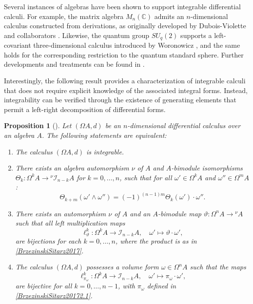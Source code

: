\documentclass{amsart}
\newtheorem{proposition}[theorem]{Proposition}
\theoremstyle{definition}
\theoremstyle{remark}
\numberwithin{equation}{section}
\begin{document}
Several instances of algebras have been shown to support integrable differential calculi. For example, the matrix algebra $M_n(\mathbb{C})$ admits an $n$-dimensional calculus constructed from derivations, as originally developed by Dubois-Violette and collaborators \cite{DuboisViolette1988, DuboisVioletteKernerMadore1990}. Likewise, the quantum group $SU_q(2)$ supports a left-covariant three-dimensional calculus introduced by Woronowicz \cite{Woronowicz1987}, and the same holds for the corresponding restriction to the quantum standard sphere. Further developments and treatments can be found in \cite{BrzezinskiElKaoutitLomp2010}.

Interestingly, the following result provides a characterization of integrable calculi that does not require explicit knowledge of the associated integral forms. Instead, integrability can be verified through the existence of generating elements that permit a left-right decomposition of differential forms.

\begin{proposition}[{\cite[Theorem 2.2]{BrzezinskiSitarz2017}}]\label{integrableequiva}
Let $(\Omega A, d)$ be an $n$-dimensional differential calculus over an algebra $A$. The following statements are equivalent:
\begin{enumerate}
    \item [\rm (1)] The calculus $(\Omega A, d)$ is integrable.

    \item [\rm (2)] There exists an algebra automorphism $\nu$ of $A$ and $A$-bimodule isomorphisms $\Theta_k: \Omega^k A \to {}^{\nu} \mathcal{I}_{n-k} A$ for $k = 0, \dotsc, n$, such that for all $\omega' \in \Omega^k A$ and $\omega'' \in \Omega^m A$:
    \[
    \Theta_{k+m}(\omega' \wedge \omega'') = (-1)^{(n-1)m} \Theta_k(\omega') \cdot \omega''.
    \]

    \item [\rm (3)] There exists an automorphism $\nu$ of $A$ and an $A$-bimodule map $\vartheta: \Omega^n A \to {}^{\nu} A$ such that all left multiplication maps
    \[
    \ell^{k}_{\vartheta}: \Omega^k A \to \mathcal{I}_{n-k} A, \quad \omega' \mapsto \vartheta \cdot \omega',
    \]
    are bijections for each $k = 0, \dotsc, n$, where the product is as in \eqref{BrzezinskiSitarz2017}.

    \item [\rm (4)] The calculus $(\Omega A, d)$ possesses a volume form $\omega \in \Omega^n A$ such that the maps
    \[
    \ell^k_{\pi_{\omega}}: \Omega^k A \to \mathcal{I}_{n-k} A, \quad \omega' \mapsto \pi_{\omega} \cdot \omega',
    \]
    are bijective for all $k = 0, \dotsc, n-1$, with $\pi_{\omega}$ defined in \eqref{BrzezinskiSitarz20172.1}.
\end{enumerate}
\end{proposition}
\end{document}
